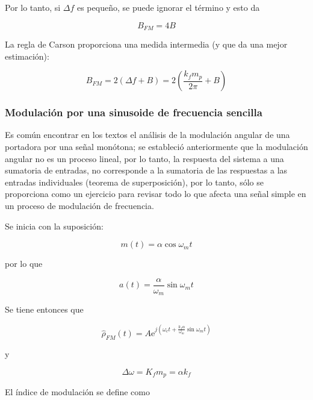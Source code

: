 \documentclass[12pt,letterpaper,titlepage,twoside]{book}
\newcommand{\me}{\mathrm{e}}
\begin{document}
Por lo tanto, si $\Delta f$ es pequeño, se puede ignorar el término y esto da

\begin{equation}
B_{FM} = 4B
\end{equation}

La regla de Carson proporciona una medida intermedia (y que da una mejor estimación):

\begin{equation}
B_{FM} = 2 \left( \Delta f +B \right) = 2\left(  \frac{k_f m_p}{2 \pi} +B \right)
\end{equation}



\subsubsection{Modulación por una sinusoide de frecuencia sencilla}

Es común encontrar en los textos el análisis de la modulación angular de una portadora por una señal monótona; se estableció anteriormente que la modulación angular no es un proceso lineal, por lo tanto, la respuesta del sistema a una sumatoria de entradas, no corresponde a la sumatoria de las respuestas a las entradas individuales (teorema de superposición), por lo tanto, sólo se proporciona como un ejercicio para revisar todo lo que afecta una señal simple en un proceso de modulación de frecuencia.

Se inicia con la suposición:

\begin{equation}
m(t) = \alpha \cos \omega_m t
\end{equation}

por lo que 

\begin{equation}
a(t) = \frac{\alpha}{\omega_m} \sin \omega_m t
\end{equation}

Se tiene entonces que 

\begin{equation}
\widehat{\rho}_{FM} \left( t \right)  = A \me^{j \left( \omega_c t +  \frac{k_f \alpha}{\omega_m} \sin \omega_m t \right)}  
\end{equation}

y 

\begin{equation}
\Delta \omega  = K_f m_p = \alpha k_f
\end{equation}

El índice de modulación se define como
\end{document}
